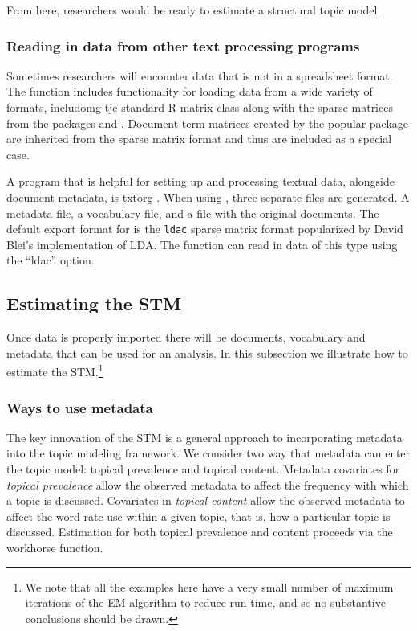 \documentclass[nojss]{jss}
\begin{document}
From here, researchers would be ready to estimate a structural topic model.

\subsubsection{Reading in data from other text processing programs}

Sometimes researchers will encounter data that is not in a spreadsheet format. The  function includes functionality for loading data from a wide variety of formats, includomg tje standard R matrix class along with the sparse matrices from the packages  and .  Document term matrices created by the popular package  are inherited from the  sparse matrix format and thus are included as a special case.

A program that is helpful for setting up and processing textual data, alongside document metadata, is \href{www.txtorg.org}{txtorg} \citep{TextComparative}. When using , three separate files are generated. A metadata file, a vocabulary file, and a file with the original documents. The default export format for  is the \texttt{ldac} sparse matrix format popularized by David Blei's implementation of LDA.  The  function can read in data of this type using the ``ldac'' option.

\subsection{Estimating the STM}

Once data is properly imported there will be documents, vocabulary and metadata that can be used for an analysis. In this subsection we illustrate how to estimate the STM.\footnote{We note that all the examples here have a very small number of maximum iterations of the EM algorithm to reduce run time, and so no substantive conclusions should be drawn.}

\subsubsection{Ways to use metadata}

The key innovation of the STM is a general approach to incorporating metadata into the topic modeling framework.  We consider two way that metadata can enter the topic model: topical prevalence and topical content.  Metadata covariates for \emph{topical prevalence} allow the observed metadata to affect the frequency with which a topic is discussed.  Covariates in \emph{topical content} allow the observed metadata to affect the word rate use within a given topic, that is, how a particular topic is discussed. Estimation for both topical prevalence and content proceeds via the workhorse  function.
\end{document}

